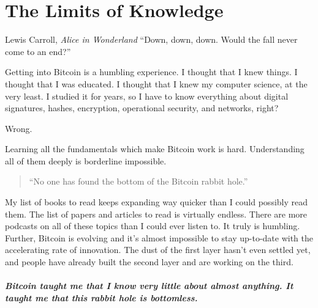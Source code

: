 \chapter{ The Limits of Knowledge}
\label{les:7}

\begin{chapquote}{Lewis Carroll, \textit{Alice in Wonderland}}
``Down, down, down. Would the fall never come to an end?''
\end{chapquote}

Getting into Bitcoin is a humbling experience. I thought that I knew
things. I thought that I was educated. I thought that I knew my computer
science, at the very least. I studied it for years, so I have to know
everything about digital signatures, hashes, encryption, operational
security, and networks, right?

Wrong.

Learning all the fundamentals which make Bitcoin work is hard.
Understanding all of them deeply is borderline impossible.

\begin{quotation}
``No one has found the bottom of the Bitcoin rabbit hole.''
\end{quotation}

My list of books to read keeps expanding way quicker than I could
possibly read them. The list of papers and articles to read is virtually
endless. There are more podcasts on all of these topics than I could
ever listen to. It truly is humbling. Further, Bitcoin is evolving and
it's almost impossible to stay up-to-date with the accelerating rate of
innovation. The dust of the first layer hasn't even settled yet, and
people have already built the second layer and are working on the third.

\paragraph{Bitcoin taught me that I know very little about almost anything. It
taught me that this rabbit hole is bottomless.}

%
%
%
%
%
